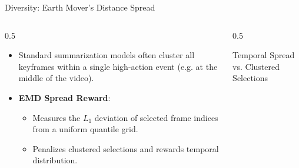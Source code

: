 \documentclass[aspectratio=169]{beamer}
\begin{document}
\begin{frame}{Diversity: Earth Mover's Distance Spread}
    \begin{columns}
        \begin{column}{0.5\textwidth}
            \begin{itemize}
                \item Standard summarization models often cluster all keyframes within a single high-action event (e.g. at the middle of the video).
                \item \textbf{EMD Spread Reward}:
                \begin{itemize}
                    \item Measures the $L_1$ deviation of selected frame indices from a uniform quantile grid.
                    \item Penalizes clustered selections and rewards temporal distribution.
                \end{itemize}
            \end{itemize}
        \end{column}
        \begin{column}{0.5\textwidth}
            \begin{block}{Temporal Spread vs. Clustered Selections}
                \centering
            \end{block}
        \end{column}
    \end{columns}
\end{frame}
\end{document}
